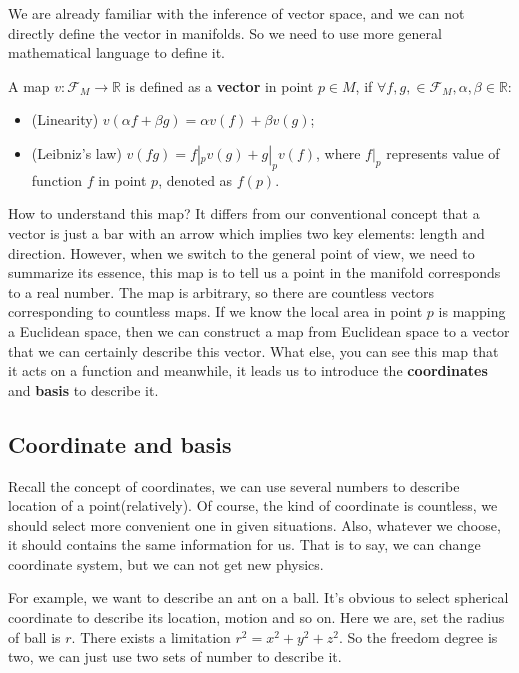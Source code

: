 We are already familiar with the inference of vector space, and we can not directly define the vector in manifolds. So we need to use more general mathematical language to define it.

\begin{tcolorbox}[title=\textbf{Vector},colback=SeaGreen!10!CornflowerBlue!10,colframe=RoyalPurple!55!Aquamarine!100!]
    A map $v:\mathscr{F}_{M}\rightarrow \mathbb{R}$ is defined as a \textbf{vector} in point $p\in M$, if $\forall f,g,\in \mathscr{F}_{M}, \alpha,\beta\in \mathbb{R}$:
    \begin{itemize}
        \item (Linearity) $v(\alpha f+\beta g)= \alpha v(f)+\beta v(g)$;
        \item (Leibniz's law) $v(fg)=f|_{p}v(g)+g|_{p}v(f)$,  where $f|_{p}$ represents value of function $f$ in point $p$, denoted as $f(p)$.
    \end{itemize}
\end{tcolorbox}

How to understand this map? It differs from our conventional concept that a vector is just a bar with an arrow which implies two key elements: length and direction. However, when we switch to the general point of view, we need to summarize its essence, this map is to tell us a point in the manifold corresponds to a real number. The map is arbitrary, so there are countless vectors corresponding to countless maps. If we know the local area in point $p$ is mapping a Euclidean space, then we can construct a map from Euclidean space to a vector that we can certainly describe this vector. What else, you can see this map that it acts on a function and meanwhile, it leads us to introduce the \textbf{coordinates} and \textbf{basis} to describe it.

\subsection{Coordinate and basis}

Recall the concept of coordinates, we can use several numbers to describe location of a point(relatively). Of course, the kind of coordinate is countless, we should select more convenient one in given situations. Also, whatever we choose, it should contains the same information for us. That is to say, we can change coordinate system, but we can not get new physics.

For example, we want to describe an ant on a ball. It's obvious to select spherical coordinate to describe its location, motion and so on. Here we are, set the radius of ball is $r$. There exists a limitation $r^{2}=x^{2}+y^{2}+z^{2}$. So the freedom degree is two, we can just use two sets of number to describe it.

